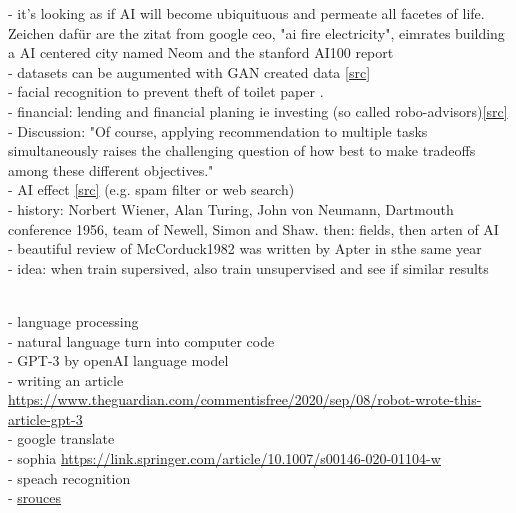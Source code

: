  - it's looking as if AI will become ubiquituous and permeate all facetes of life. Zeichen dafür are the  zitat from google ceo, "ai fire electricity", eimrates building a AI centered city named Neom and the stanford AI100 report \cite{Littman2021}\\
 - datasets can be augumented with GAN created data [\href{https://arxiv.org/abs/1711.04340}{src}]\\
 - facial recognition to prevent theft of toilet paper \cite{Andrews2017}.\\
 - financial: lending and financial planing ie investing (so called robo-advisors)\cite{Littman2021}\href{https://ai100.stanford.edu/2021-report/standing-questions-and-responses/sq2-what-are-most-important-advances-ai}{[src]}\\
 - Discussion: "Of course, applying recommendation to multiple tasks simultaneously raises the challenging question of how best to make tradeoffs among these different objectives."\cite{Littman2021}\\
 - AI effect \href{https://ai100.stanford.edu/2016-report/section-i-what-artificial-intelligence/defining-ai#\_ftnref3}{[src]} \cite{McCorduck1982} (e.g. spam filter or web search) \\
 - history: Norbert Wiener, Alan Turing, John von Neumann, Dartmouth conference 1956, team of Newell, Simon and Shaw. then: fields, then arten of AI \\
 - beautiful review of McCorduck1982\cite{McCorduck1982} was written by Apter in sthe same year\cite{Apter1982}\\
 - idea: when train supersived, also train unsupervised and see if similar results
 
\\
 - language processing\\
 - natural language turn into computer code \\
 - GPT-3 by openAI language model \\
 - writing an article \url{https://www.theguardian.com/commentisfree/2020/sep/08/robot-wrote-this-article-gpt-3}\\
 - google translate \\
 - sophia \url{https://link.springer.com/article/10.1007/s00146-020-01104-w}\\
 - speach recognition\\
 - \href{https://ai100.stanford.edu/2021-report/standing-questions-and-responses/sq2-what-are-most-important-advances-ai#_2021SQ2ref3}{srouces}\\


